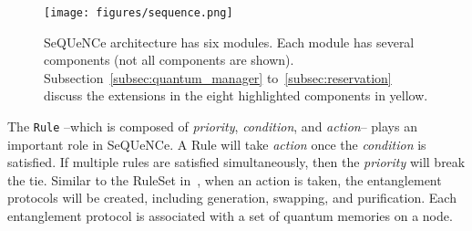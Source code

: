 \begin{figure}[b]
    \vspace{-0.2in}
    \centering
    \texttt{[image: figures/sequence.png]}
    \vspace{-0.1in}
    \caption{SeQUeNCe architecture has six modules.
    Each module has several components (not all components are shown).
    Subsection~\ref{subsec:quantum_manager} to~\ref{subsec:reservation} discuss the extensions in the eight highlighted components in yellow.}
    \vspace{-0.1in}
    \label{fig:sequence}
\end{figure}




The \texttt{Rule} --which is composed of \emph{priority}, \emph{condition}, and \emph{action}-- plays an important role in SeQUeNCe. 
A Rule will take \emph{action} once the \emph{condition} is satisfied.
If multiple rules are satisfied simultaneously, then the \emph{priority} will break the tie.
Similar to the RuleSet in~\cite{matsuo-ruleset-pra19}, when an action is taken, the entanglement protocols will be created, including generation, swapping, and purification.
Each entanglement protocol is associated with a set of quantum memories on a node.




